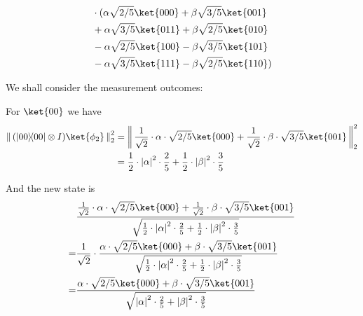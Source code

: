 \documentclass{article}
\newcommand{\ketbra}[2]{|#1\rangle\!\langle #2|}
\newcommand{\norm}[1]{\left\|\,#1\,\right\|}       %
\newcommand{\enorm}[1]{\norm{#1}_{\mathrm{2}}}      %
\newcommand{\abs}[1]{\left\lvert #1 \right\rvert}
\begin{document}
\begin{enumerate}
$$\begin{aligned}
                         & \cdot(\alpha\sqrt{2/5}\ket{000}+\beta\sqrt{3/5}\ket{001}                                                                       \\
                         & +\alpha\sqrt{3/5}\ket{011}+\beta\sqrt{2/5}\ket{010}                                                                            \\
                         & -\alpha\sqrt{2/5}\ket{100}-\beta\sqrt{3/5}\ket{101}                                                                            \\
                         & -\alpha\sqrt{3/5}\ket{111}-\beta\sqrt{2/5}\ket{110})                                                                           \\
          \end{aligned}$$

        We shall consider the measurement outcomes:

        For $\ket{00}$ we have $$\begin{aligned}
            \enorm{(\ketbra{00}{00}\otimes I)\ket{\phi_2}}^2 & =\enorm{\frac{1}{\sqrt{2}}\cdot\alpha\cdot\sqrt{2/5}\ket{000}+\frac{1}{\sqrt{2}}\cdot\beta\cdot\sqrt{3/5}\ket{001}}^2 \\
                                                             & =\frac{1}{2}\cdot\abs{\alpha}^2\cdot\frac{2}{5}+\frac{1}{2}\cdot\abs{\beta}^2\cdot\frac{3}{5}                         \\
          \end{aligned}$$

        And the new state is $$\begin{aligned}
              & \frac{\frac{1}{\sqrt{2}}\cdot\alpha\cdot\sqrt{2/5}\ket{000}+\frac{1}{\sqrt{2}}\cdot\beta\cdot\sqrt{3/5}\ket{001}}{\sqrt{\frac{1}{2}\cdot\abs{\alpha}^2\cdot\frac{2}{5}+\frac{1}{2}\cdot\abs{\beta}^2\cdot\frac{3}{5}}} \\
            = & \frac{1}{\sqrt{2}}\cdot\frac{\alpha\cdot\sqrt{2/5}\ket{000}+\beta\cdot\sqrt{3/5}\ket{001}}{\sqrt{\frac{1}{2}\cdot\abs{\alpha}^2\cdot\frac{2}{5}+\frac{1}{2}\cdot\abs{\beta}^2\cdot\frac{3}{5}}}                        \\
            = & \frac{\alpha\cdot\sqrt{2/5}\ket{000}+\beta\cdot\sqrt{3/5}\ket{001}}{\sqrt{\abs{\alpha}^2\cdot\frac{2}{5}+\abs{\beta}^2\cdot\frac{3}{5}}}                                                                               \\
          \end{aligned}$$


\end{enumerate}
\end{document}
